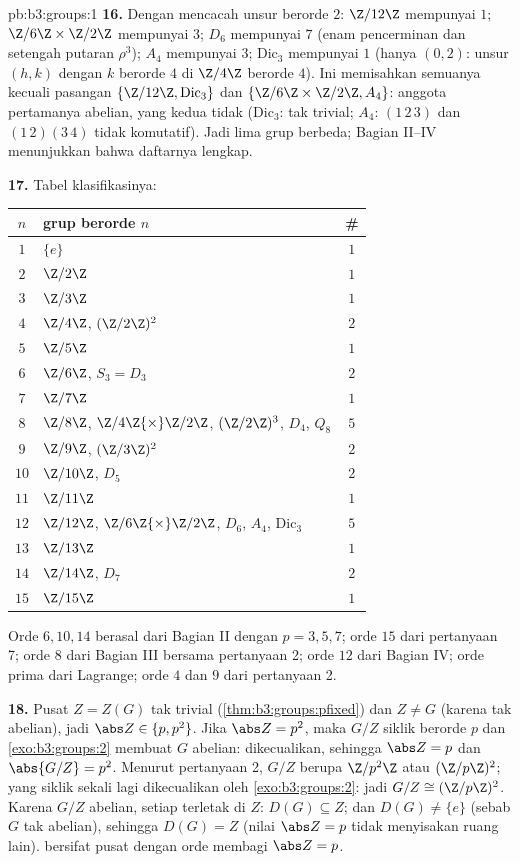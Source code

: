 \begin{solution}{pb:b3:groups:1}
\textbf{16.} Dengan mencacah unsur berorde $2$: $\Z/12\Z$ mempunyai $1$;
$\Z/6\Z\times\Z/2\Z$ mempunyai $3$; $D_6$ mempunyai $7$ (enam pencerminan dan
setengah putaran $\rho^3$); $A_4$ mempunyai $3$; $\mathrm{Dic}_3$ mempunyai $1$
(hanya $(0, 2)$: unsur $(h, k)$ dengan $k$ berorde $4$ di
$\Z/4\Z$ berorde $4$). Ini memisahkan semuanya kecuali pasangan
$\{\Z/12\Z, \mathrm{Dic}_3\}$ dan $\{\Z/6\Z\times\Z/2\Z, A_4\}$:
anggota pertamanya abelian, yang kedua tidak ($\mathrm{Dic}_3$:
 tak trivial; $A_4$: $(1\,2\,3)$ dan
$(1\,2)(3\,4)$ tidak komutatif). Jadi lima grup berbeda; Bagian
II--IV menunjukkan bahwa daftarnya lengkap.

\textbf{17.} Tabel klasifikasinya:
\begin{center}
\begin{tabular}{c l c}
$n$ & grup berorde $n$ & \#\\
\hline
$1$ & $\{e\}$ & $1$\\
$2$ & $\Z/2\Z$ & $1$\\
$3$ & $\Z/3\Z$ & $1$\\
$4$ & $\Z/4\Z$, $(\Z/2\Z)^2$ & $2$\\
$5$ & $\Z/5\Z$ & $1$\\
$6$ & $\Z/6\Z$, $S_3 = D_3$ & $2$\\
$7$ & $\Z/7\Z$ & $1$\\
$8$ & $\Z/8\Z$, $\Z/4\Z{\times}\Z/2\Z$, $(\Z/2\Z)^3$, $D_4$,
      $Q_8$ & $5$\\
$9$ & $\Z/9\Z$, $(\Z/3\Z)^2$ & $2$\\
$10$ & $\Z/10\Z$, $D_5$ & $2$\\
$11$ & $\Z/11\Z$ & $1$\\
$12$ & $\Z/12\Z$, $\Z/6\Z{\times}\Z/2\Z$, $D_6$, $A_4$,
       $\mathrm{Dic}_3$ & $5$\\
$13$ & $\Z/13\Z$ & $1$\\
$14$ & $\Z/14\Z$, $D_7$ & $2$\\
$15$ & $\Z/15\Z$ & $1$\\
\end{tabular}
\end{center}
Orde $6, 10, 14$ berasal dari Bagian II dengan $p = 3, 5, 7$; orde $15$ dari
pertanyaan 7; orde $8$ dari Bagian III bersama pertanyaan 2; orde
$12$ dari Bagian IV; orde prima dari Lagrange; orde $4$ dan $9$
dari pertanyaan 2.

\textbf{18.} Pusat $Z = Z(G)$ tak trivial
(\cref{thm:b3:groups:pfixed}) dan $Z \neq G$ (karena tak abelian), jadi
$\abs Z \in \{p, p^2\}$. Jika $\abs Z = p^2$, maka $G/Z$ siklik
berorde $p$ dan \cref{exo:b3:groups:2} membuat $G$ abelian:
dikecualikan, sehingga $\abs Z = p$ dan $\abs{G/Z} = p^2$. Menurut pertanyaan 2,
$G/Z$ berupa $\Z/p^2\Z$ atau $(\Z/p\Z)^2$; yang siklik sekali lagi dikecualikan oleh
\cref{exo:b3:groups:2}: jadi $G/Z \cong (\Z/p\Z)^2$. Karena $G/Z$
abelian, setiap  terletak di $Z$: $D(G) \subseteq Z$; dan
$D(G) \neq \{e\}$ (sebab $G$ tak abelian), sehingga $D(G) = Z$ (nilai $\abs Z = p$
tidak menyisakan ruang lain).  bersifat pusat dengan orde membagi
$\abs Z = p$.


\end{solution}
